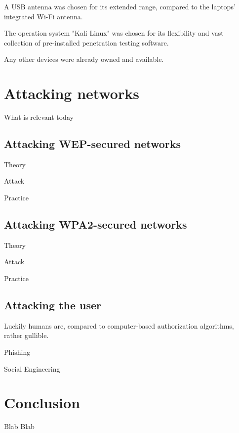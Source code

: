 A USB antenna was chosen for its extended range, compared to the laptops' integrated Wi-Fi antenna.

The operation system "Kali Linux" was chosen for its flexibility and vast collection of pre-installed penetration testing software.

Any other devices were already owned and available.

\section{Attacking networks}

What is relevant today

\subsection{Attacking WEP-secured networks}

Theory

Attack

Practice

\subsection{Attacking WPA2-secured networks}

Theory

Attack

Practice

\subsection{Attacking the user}

Luckily humans are, compared to computer-based authorization algorithms, rather gullible. 

Phishing

Social Engineering

\section{Conclusion}

Blab Blab